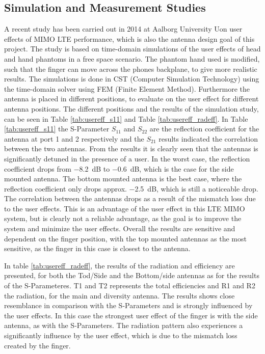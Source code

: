 \subsection{Simulation and Measurement Studies}
A recent study has been carried out in 2014 at Aalborg University Uon user effects of MIMO LTE performance, which is also the antenna design goal of this project. The study is based on time-domain simulations of the user effects of head and hand phantoms in a free space scenario. The phantom hand used is modified, such that the finger can move across the phones backplane, to give more realistic results. The simulations is done in CST (Computer Simulation Technology) using the time-domain solver using FEM (Finite Element Method). Furthermore the antenna is placed in different positions, to evaluate on the user effect for different antenna positions. The different positions and the results of the simulation study, can be seen in Table \ref{tab:usereff_s11} and Table \ref{tab:usereff_radeff}. In Table \ref{tab:usereff_s11} the S-Parameter $S_{11}$ and $S_{22}$ are the reflection coefficient for the antenna at port 1 and 2 respectively and the $S_{21}$ results indicated the correlation between the two antennas. From the results it is clearly seen that the antennas is significantly detuned in the presence of a user. In the worst case, the reflection coefficient drops from \SI{-8.2}{dB} to \SI{-0.6}{dB}, which is the case for the side mounted antenna. The bottom mounted antenna is the best case, where the reflection coefficient only drops approx. \SI{-2.5}{dB}, which is still a noticeable drop. The correlation between the antennas drops as a result of the mismatch loss due to the user effects. This is an advantage of the user effect in this LTE MIMO system, but is clearly not a reliable advantage, as the goal is to improve the system and minimize the user effects. Overall the results are sensitive and dependent on the finger position, with the top mounted antennas as the most sensitive, as the finger in this case is closest to the antenna.


In table \ref{tab:usereff_radeff}, the results of the radiation and efficiency are presented, for both the Tod/Side and the Bottom/side antennas as for the results of the S-Parameteres. T1 and T2 represents the total efficiencies and R1 and R2 the radiation, for the main and diversity antenna. 
The results shows close resemblance in comparison with the S-Parameters and is strongly influenced by the user effects. In this case the strongest user effect of the finger is with the side antenna, as with the S-Parameters. The radiation pattern also experiences a significantly influence by the user effect, which is due to the mismatch loss created by the finger.  \cite{Samantha2014UserEff}     

